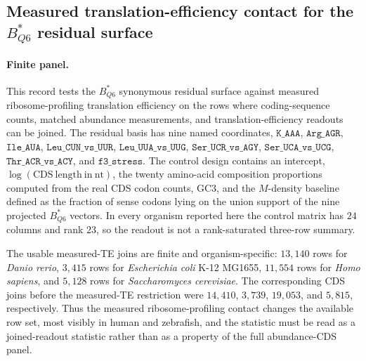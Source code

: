 
\subsection{Measured translation-efficiency contact for the $B^*_{Q6}$ residual surface}
\label{sec:bior-reality-q6-measured-te-contact}

\paragraph{Finite panel.}
This record tests the $B^*_{Q6}$ synonymous residual surface against measured ribosome-profiling translation efficiency on the rows where coding-sequence counts, matched abundance measurements, and translation-efficiency readouts can be joined.  The residual basis has nine named coordinates,
$\texttt{K\_AAA}$, $\texttt{Arg\_AGR}$, $\texttt{Ile\_AUA}$, $\texttt{Leu\_CUN\_vs\_UUR}$, $\texttt{Leu\_UUA\_vs\_UUG}$, $\texttt{Ser\_UCR\_vs\_AGY}$, $\texttt{Ser\_UCA\_vs\_UCG}$, $\texttt{Thr\_ACR\_vs\_ACY}$, and $\texttt{f3\_stress}$.  The control design contains an intercept, $\log(\mathrm{CDS\ length\ in\ nt})$, the twenty amino-acid composition proportions computed from the real CDS codon counts, GC3, and the $M$-density baseline defined as the fraction of sense codons lying on the union support of the nine projected $B^*_{Q6}$ vectors.  In every organism reported here the control matrix has $24$ columns and rank $23$, so the readout is not a rank-saturated three-row summary.

The usable measured-TE joins are finite and organism-specific: $13{,}140$ rows for \emph{Danio rerio}, $3{,}415$ rows for \emph{Escherichia coli} K-12 MG1655, $11{,}554$ rows for \emph{Homo sapiens}, and $5{,}128$ rows for \emph{Saccharomyces cerevisiae}.  The corresponding CDS joins before the measured-TE restriction were $14{,}410$, $3{,}739$, $19{,}053$, and $5{,}815$, respectively.  Thus the measured ribosome-profiling contact changes the available row set, most visibly in human and zebrafish, and the statistic must be read as a joined-readout statistic rather than as a property of the full abundance-CDS panel.

